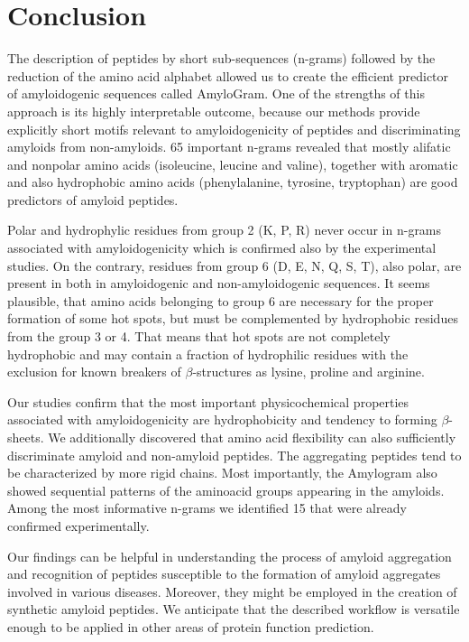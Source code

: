\documentclass[fleqn,10pt,twoside]{gcb15submission}
\begin{document}
\section{Conclusion}

The description of peptides by short sub-sequences (n-grams) followed by the 
reduction of the amino acid alphabet allowed us to create the efficient 
predictor of amyloidogenic sequences called AmyloGram. One of the strengths of 
this approach is its highly interpretable outcome, because our methods provide 
explicitly short motifs relevant to amyloidogenicity of peptides and 
discriminating amyloids from  non-amyloids. 65 important n-grams revealed that 
mostly alifatic and nonpolar amino acids (isoleucine, leucine and valine), 
together with aromatic and also hydrophobic amino acids (phenylalanine, 
tyrosine, tryptophan)  are good predictors of amyloid peptides.

  Polar and hydrophylic residues from group 2 (K, P, R) never occur in n-grams 
associated with amyloidogenicity which is confirmed also by the experimental 
studies. On the contrary, residues from group 6 (D, E, N, Q, S, T), also polar, 
are present in both in amyloidogenic and non-amyloidogenic sequences. It seems 
plausible, that amino acids belonging to group 6 are necessary for the proper 
formation of some hot spots, but must be complemented by hydrophobic residues 
from the group 3 or 4. That means that hot spots are not completely hydrophobic 
and may contain a fraction of hydrophilic residues with the exclusion for known 
breakers of $\beta$-structures as lysine, proline and arginine.

  Our studies confirm that the most important physicochemical properties 
associated with amyloidogenicity are hydrophobicity and tendency to forming 
$\beta$-sheets.  We additionally discovered that amino acid flexibility can also 
sufficiently discriminate amyloid and non-amyloid peptides. The aggregating 
peptides tend to be characterized by more rigid chains. Most importantly, the 
Amylogram also showed sequential patterns of the aminoacid groups appearing in 
the amyloids. Among the most informative n-grams we identified 15 that were 
already confirmed experimentally. 

  Our findings can be helpful in understanding the process of amyloid 
aggregation and recognition of peptides susceptible to the formation of amyloid 
aggregates involved in various diseases. Moreover, they might be employed in the 
creation of synthetic amyloid peptides. We anticipate that the described 
workflow is versatile enough to be applied in other areas of protein function 
prediction.
\end{document}
